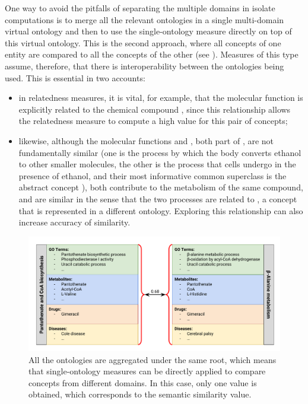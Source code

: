One way to avoid the pitfalls of separating the multiple domains in isolate computations is to merge all the relevant ontologies in a single multi-domain virtual ontology and then to use the single-ontology measure directly on top of this virtual ontology. This is the second approach, where all concepts of one entity are compared to all the concepts of the other (see ). Measures of this type assume, therefore, that there is interoperability between the ontologies being used. This is essential in two accounts:
\begin{itemize}
    \item in relatedness measures, it is vital, for example, that the molecular function  is explicitly related to the chemical compound , since this relationship allows the relatedness measure to compute a high value for this pair of concepts;
    \item likewise, although the molecular functions  and , both part of , are not fundamentally similar (one is the process by which the body converts ethanol to other smaller molecules, the other is the process that cells undergo in the presence of ethanol, and their most informative common superclass is the abstract concept ), both contribute to the metabolism of the same compound, and are similar in the sense that the two processes are related to , a concept that is represented in a different ontology. Exploring this relationship can also increase accuracy of similarity.
\end{itemize}

\begin{figure}
    \centering
    \includegraphics[width=\linewidth]{images/multi-integrative.pdf}
    \caption[The integrative approach]{All the ontologies are aggregated under the same root, which means that single-ontology measures can be directly applied to compare concepts from different domains. In this case, only one value is obtained, which corresponds to the semantic similarity value.}
    \label{fig:integrative}
\end{figure}

